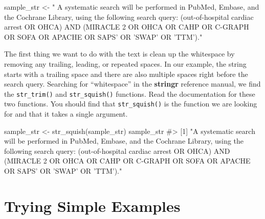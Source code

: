 \documentclass[
  letterpaper,
]{krantz}
\makeatletter
\newenvironment{Shaded}{\begin{snugshade}}{\end{snugshade}}
\newcommand{\CommentTok}[1]{\textcolor[rgb]{0.37,0.37,0.37}{#1}}
\newcommand{\FunctionTok}[1]{\textcolor[rgb]{0.28,0.35,0.67}{#1}}
\newcommand{\NormalTok}[1]{\textcolor[rgb]{0.00,0.23,0.31}{#1}}
\newcommand{\OtherTok}[1]{\textcolor[rgb]{0.00,0.23,0.31}{#1}}
\newcommand{\StringTok}[1]{\textcolor[rgb]{0.13,0.47,0.30}{#1}}
\newenvironment{kframe}{%
\medskip{}
\setlength{\fboxsep}{.8em}
 \def\at@end@of@kframe{}%
 \ifinner\ifhmode%
  \def\at@end@of@kframe{\end{minipage}}%
  \begin{minipage}{\columnwidth}%
 \fi\fi%
 \def\FrameCommand##1{\hskip\@totalleftmargin \hskip-\fboxsep
 \colorbox{shadecolor}{##1}\hskip-\fboxsep
     \hskip-\linewidth \hskip-\@totalleftmargin \hskip\columnwidth}%
 \MakeFramed {\advance\hsize-\width
   \@totalleftmargin\z@ \linewidth\hsize
   \@setminipage}}%
 {\par\unskip\endMakeFramed%
 \at@end@of@kframe}
\renewenvironment{Shaded}{\begin{kframe}}{\end{kframe}}
\makeatother
\begin{document}
\begin{Shaded}
\begin{Highlighting}[]
\NormalTok{sample\_str }\OtherTok{\textless{}{-}} \StringTok{" A systematic search will be performed in PubMed, }
\StringTok{Embase, and the Cochrane Library, using the following search query:   }
\StringTok{(\textquotesingle{}out{-}of{-}hospital cardiac arrest\textquotesingle{} OR \textquotesingle{}OHCA\textquotesingle{}) AND (\textquotesingle{}MIRACLE 2\textquotesingle{} OR }
\StringTok{\textquotesingle{}OHCA\textquotesingle{} OR \textquotesingle{}CAHP\textquotesingle{} OR \textquotesingle{}C{-}GRAPH\textquotesingle{} OR \textquotesingle{}SOFA\textquotesingle{} OR \textquotesingle{}APACHE\textquotesingle{} OR \textquotesingle{}SAPS’ OR }
\StringTok{’SWAP’ OR ’TTM’)."}
\end{Highlighting}
\end{Shaded}

The first thing we want to do with the text is clean up the whitespace
by removing any trailing, leading, or repeated spaces. In our example,
the string starts with a trailing space and there are also multiple
spaces right before the search query. Searching for ``whitespace'' in
the \textbf{stringr} reference manual, we find the \texttt{str\_trim()}
and \texttt{str\_squish()} functions. Read the documentation for these
two functions. You should find that \texttt{str\_squish()} is the
function we are looking for and that it takes a single argument.

\begin{Shaded}
\begin{Highlighting}[]
\NormalTok{sample\_str }\OtherTok{\textless{}{-}} \FunctionTok{str\_squish}\NormalTok{(sample\_str)}
\NormalTok{sample\_str}
\CommentTok{\#\textgreater{} [1] "A systematic search will be performed in PubMed, Embase, and the Cochrane Library, using the following search query: (\textquotesingle{}out{-}of{-}hospital cardiac arrest\textquotesingle{} OR \textquotesingle{}OHCA\textquotesingle{}) AND (\textquotesingle{}MIRACLE 2\textquotesingle{} OR \textquotesingle{}OHCA\textquotesingle{} OR \textquotesingle{}CAHP\textquotesingle{} OR \textquotesingle{}C{-}GRAPH\textquotesingle{} OR \textquotesingle{}SOFA\textquotesingle{} OR \textquotesingle{}APACHE\textquotesingle{} OR \textquotesingle{}SAPS’ OR ’SWAP’ OR ’TTM’)."}
\end{Highlighting}
\end{Shaded}

\section{Trying Simple Examples}\label{trying-simple-examples}
\end{document}
